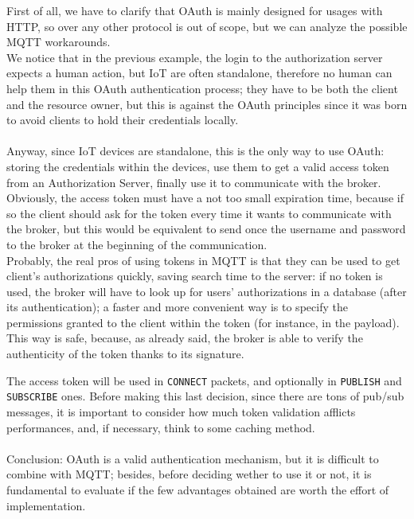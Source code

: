 \documentclass[12pt]{report}
\begin{document}
{First of all, we have to clarify that OAuth is mainly designed for usages with HTTP, so over any other protocol is out of scope, but we can analyze the possible MQTT workarounds.\\
We notice that in the previous example, the login to the authorization server expects a human action, but IoT are often standalone, therefore no human can help them in this OAuth authentication process; they have to be both the client and the resource owner, but this is against the OAuth principles since it was born to avoid clients to hold their credentials locally.\\\\
Anyway, since IoT devices are standalone, this is the only way to use OAuth: storing the credentials within the devices, use them to get a valid access token from an Authorization Server, finally use it to communicate with the broker.\\Obviously, the access token must have a not too small expiration time, because if so the client should ask for the token every time it wants to communicate with the broker, but this would be equivalent to send once the username and password to the broker at the beginning of the communication.\\

Probably, the real pros of using tokens in MQTT is that they can be used to get client's authorizations quickly, saving search time to the server: if no token is used, the broker will have to look up for users' authorizations in a database (after its authentication); a faster and more convenient way is to specify the permissions granted to the client within the token (for instance, in the payload). \\
This way is safe, because, as already said, the broker is able to verify the authenticity of the token thanks to its signature.

The access token will be used in \texttt{CONNECT} packets, and optionally in \texttt{PUBLISH} and \texttt{SUBSCRIBE} ones. Before making this last decision, since there are tons of pub/sub messages, it is important to consider how much token validation afflicts performances, and, if necessary, think to some caching method.\\\\

Conclusion: OAuth is a valid authentication mechanism, but it is difficult to combine with MQTT; besides, before deciding wether to use it or not, it is fundamental to evaluate if the few advantages obtained are worth the effort of implementation.


}
\end{document}
